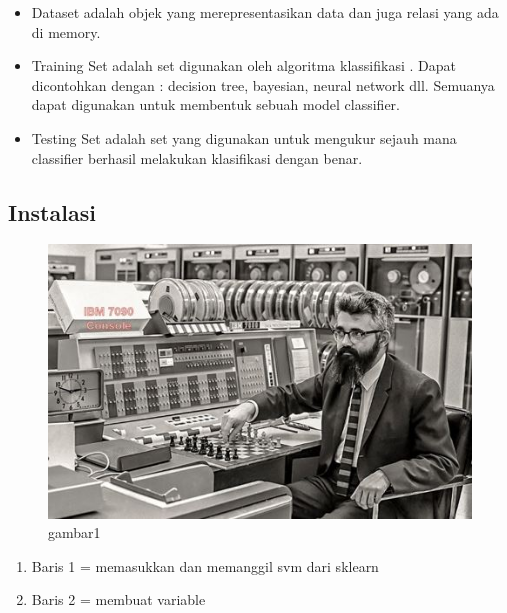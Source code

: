 \begin{itemize}
\begin{itemize}
\item Dataset adalah objek yang merepresentasikan data dan juga relasi yang ada di memory.
\par
\item Training Set adalah set digunakan oleh algoritma klassifikasi . Dapat dicontohkan dengan :  decision tree, bayesian, neural network dll. Semuanya dapat digunakan untuk membentuk sebuah model classifier.
\par
\item Testing Set adalah set yang digunakan untuk mengukur sejauh mana classifier berhasil melakukan klasifikasi dengan benar.
\par
\end{itemize}
\end{itemize}

\subsection{Instalasi}
\begin{figure}[ht]
\centering
\includegraphics[scale=0.5]{figures/contoh.jpg}
\caption{gambar1}
\label{roza1}
\end{figure}

\begin {enumerate}
\item Baris 1 = memasukkan dan memanggil svm dari sklearn
\item Baris 2 = membuat variable
\end {enumerate}

